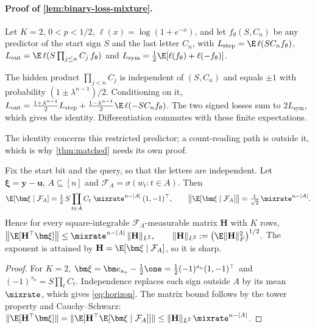 \paragraph{Proof of \cref{lem:binary-loss-mixture}.} Let $K=2$, $0<p<1/2$, $\ell(x)=\log(1+e^{-x})$, and let $f_\theta(S,C_n)$ be
any predictor of the start sign $S$ and the last letter $C_n$, with
$L_{\mathrm{step}}=\E\,\ell(SC_nf_\theta)$, $L_{\mathrm{out}}=\E\,\ell(S\prod_{j\le n}C_j\,f_\theta)$ and
$L_{\mathrm{sym}}=\frac12\E[\ell(f_\theta)+\ell(-f_\theta)]$.

The hidden product $\prod_{j<n}C_j$ is independent of $(S,C_n)$ and equals $\pm1$ with probability
$(1\pm\lambda^{n-1})/2$. Conditioning on it,
$L_{\mathrm{out}}=\frac{1+\lambda^{n-1}}2L_{\mathrm{step}}+\frac{1-\lambda^{n-1}}2\E\,\ell(-SC_nf_\theta)$.
The two signed losses sum to $2L_{\mathrm{sym}}$, which gives the identity. Differentiation commutes with these finite expectations.

The identity concerns this restricted predictor; a count-reading path is outside it, which is why
\cref{thm:matched} needs its own proof.

\begin{lemma}
\label{lem:target-contraction}
Fix the start bit and the query, so that the letters are independent. Let $\bm\xi=\bm y-\bm u$, $A\subseteq[n]$ and
$\mathcal F_A=\sigma(w_t:t\in A)$. Then
\begin{equation}
 \E[\bm\xi\mid\mathcal F_A]=\tfrac12\,S\prod_{t\in A}C_t\;\mixrate^{n-|A|}\,(1,-1)^\top,
 \qquad \bigl\|\E[\bm\xi\mid\mathcal F_A]\bigr\|=\tfrac1{\sqrt2}\,\mixrate^{n-|A|}.
 \label{eq:horizon}
\end{equation}
Hence for every square-integrable $\mathcal F_A$-measurable matrix $\mathbf H$ with $K$ rows,
 $\bigl\|\E[\mathbf H^\top\bm\xi]\bigr\|\le\mixrate^{n-|A|}\,\|\mathbf H\|_{L^2},\qquad \|\mathbf H\|_{L^2}:=\bigl(\E\|\mathbf H\|_F^2\bigr)^{1/2}.$
The exponent is attained by $\mathbf H=\E[\bm\xi\mid\mathcal F_A]$, so it is sharp.
\end{lemma}

\begin{proof}
For $K=2$, $\bm\xi=\bm e_{s_n}-\frac12\one=\frac12(-1)^{s_n}(1,-1)^\top$ and $(-1)^{s_n}=S\prod_tC_t$. Independence replaces each sign outside $A$
by its mean $\mixrate$, which gives \cref{eq:horizon}. The matrix bound follows by the tower property and Cauchy--Schwarz:
$\|\E[\mathbf H^\top\bm\xi]\|=\|\E[\mathbf H^\top\E[\bm\xi\mid\mathcal F_A]]\|\le\|\mathbf H\|_{L^2}\,\mixrate^{n-|A|}$.
\end{proof}

